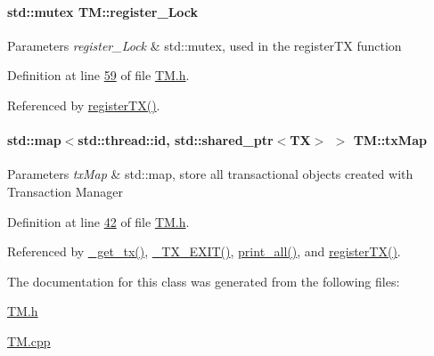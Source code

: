 \paragraph[{\texorpdfstring{register\+\_\+\+Lock}{register_Lock}}]{\setlength{\rightskip}{0pt plus 5cm}std\+::mutex T\+M\+::register\+\_\+\+Lock\hspace{0.3cm}{\ttfamily [private]}}\hypertarget{class_t_m_aeb26546681bfe64e21606b8c012bb8c3_aeb26546681bfe64e21606b8c012bb8c3}{}\label{class_t_m_aeb26546681bfe64e21606b8c012bb8c3_aeb26546681bfe64e21606b8c012bb8c3}

\begin{DoxyParams}{Parameters}
{\em register\+\_\+\+Lock} & std\+::mutex, used in the register\+TX function \\
\hline
\end{DoxyParams}


Definition at line \hyperlink{_t_m_8h_source_l00059}{59} of file \hyperlink{_t_m_8h_source}{T\+M.\+h}.



Referenced by \hyperlink{_t_m_8cpp_source_l00043}{register\+T\+X()}.

\paragraph[{\texorpdfstring{tx\+Map}{txMap}}]{\setlength{\rightskip}{0pt plus 5cm}std\+::map$<$std\+::thread\+::id, std\+::shared\+\_\+ptr$<${\bf TX}$>$ $>$ T\+M\+::tx\+Map\hspace{0.3cm}{\ttfamily [private]}}\hypertarget{class_t_m_a0333dfa193ea99d7626de74a2b932e9b_a0333dfa193ea99d7626de74a2b932e9b}{}\label{class_t_m_a0333dfa193ea99d7626de74a2b932e9b_a0333dfa193ea99d7626de74a2b932e9b}

\begin{DoxyParams}{Parameters}
{\em tx\+Map} & std\+::map, store all transactional objects created with Transaction Manager \\
\hline
\end{DoxyParams}


Definition at line \hyperlink{_t_m_8h_source_l00042}{42} of file \hyperlink{_t_m_8h_source}{T\+M.\+h}.



Referenced by \hyperlink{_t_m_8cpp_source_l00079}{\+\_\+get\+\_\+tx()}, \hyperlink{_t_m_8cpp_source_l00102}{\+\_\+\+T\+X\+\_\+\+E\+X\+I\+T()}, \hyperlink{_t_m_8cpp_source_l00122}{print\+\_\+all()}, and \hyperlink{_t_m_8cpp_source_l00043}{register\+T\+X()}.



The documentation for this class was generated from the following files\+:\begin{DoxyCompactItemize}
\item 
\hyperlink{_t_m_8h}{T\+M.\+h}\item 
\hyperlink{_t_m_8cpp}{T\+M.\+cpp}\end{DoxyCompactItemize}
